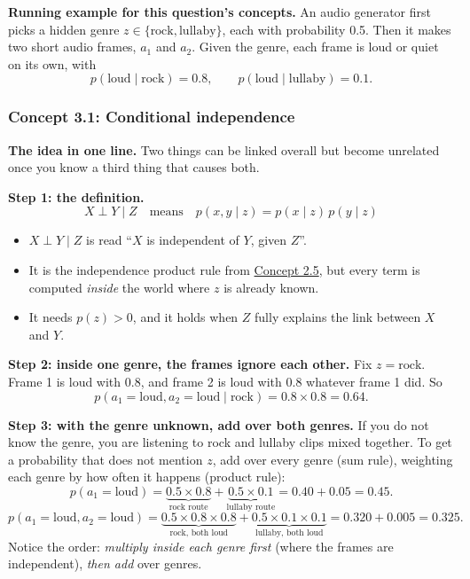 \documentclass[12pt,a4paper]{article}
\begin{document}
\textbf{Running example for this question's concepts.} An audio generator first picks a hidden genre $z\in\{\text{rock},\text{lullaby}\}$, each with probability 0.5. Then it makes two short audio frames, $a_1$ and $a_2$. Given the genre, each frame is loud or quiet on its own, with
\[
p(\text{loud}\mid\text{rock})=0.8,\qquad p(\text{loud}\mid\text{lullaby})=0.1 .
\]

\subsubsection{Concept 3.1: Conditional independence}\label{c3-1}

\textbf{The idea in one line.} Two things can be linked overall but become unrelated once you know a third thing that causes both.

\textbf{Step 1: the definition.}
\[
X\perp Y\mid Z\quad\text{means}\quad p(x,y\mid z)=p(x\mid z)\,p(y\mid z)
\]
\begin{itemize}[nosep]
  \item $X\perp Y\mid Z$ is read ``$X$ is independent of $Y$, given $Z$''.
  \item It is the independence product rule from \hyperref[c2-5]{Concept 2.5}, but every term is computed \emph{inside} the world where $z$ is already known.
  \item It needs $p(z)>0$, and it holds when $Z$ fully explains the link between $X$ and $Y$.
\end{itemize}

\textbf{Step 2: inside one genre, the frames ignore each other.} Fix $z=\text{rock}$. Frame 1 is loud with 0.8, and frame 2 is loud with 0.8 whatever frame 1 did. So
\[
p(a_1=\text{loud},a_2=\text{loud}\mid\text{rock})=0.8\times0.8=0.64 .
\]

\textbf{Step 3: with the genre unknown, add over both genres.} If you do not know the genre, you are listening to rock and lullaby clips mixed together. To get a probability that does not mention $z$, add over every genre (sum rule), weighting each genre by how often it happens (product rule):
\[
p(a_1=\text{loud})=\underbrace{0.5\times0.8}_{\text{rock route}}+\underbrace{0.5\times0.1}_{\text{lullaby route}}=0.40+0.05=0.45 .
\]
\[
p(a_1=\text{loud},a_2=\text{loud})=\underbrace{0.5\times0.8\times0.8}_{\text{rock, both loud}}+\underbrace{0.5\times0.1\times0.1}_{\text{lullaby, both loud}}=0.320+0.005=0.325 .
\]
Notice the order: \emph{multiply inside each genre first} (where the frames are independent), \emph{then add} over genres.
\end{document}
